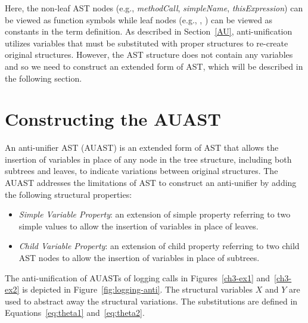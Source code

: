 Here, the non-leaf AST nodes (e.g., \textit{methodCall}, \textit{simpleName}, \textit{thisExpression}) can be viewed as function symbols while leaf nodes (e.g., , ) can be viewed as constants in the term definition. As described in Section~\ref{AU}, anti-unification utilizes variables that must be substituted with proper structures to re-create original structures. However, the AST structure does not contain any variables and so we need to construct an extended form of AST, which will be described in the following section.


\section{Constructing the AUAST} \label{AUAST}
An anti-unifier AST (AUAST) is an extended form of AST that allows the insertion of variables in place of any node in the tree structure, including both subtrees and leaves, to indicate variations between original structures. The AUAST addresses the limitations of AST to construct an anti-unifier by adding the following structural properties:
\begin{itemize} [leftmargin=.4in]
\item \textit{Simple Variable Property}: an extension of simple property referring to two simple values to allow the insertion of variables in place of leaves.
\end{itemize}
\begin{itemize} [leftmargin=.4in]
\item \textit{Child Variable Property}: an extension of child property referring to two child AST nodes to allow the insertion of variables in place of subtrees.
\end{itemize}
The anti-unification of AUASTs of logging calls in Figures~\ref{ch3-ex1} and~\ref{ch3-ex2} is depicted in Figure~\ref{fig:logging-anti}. The structural variables $X$ and $Y$ are used to abstract away the structural variations.  The substitutions are defined in Equations~\ref{eq:theta1} and~\ref{eq:theta2}.


